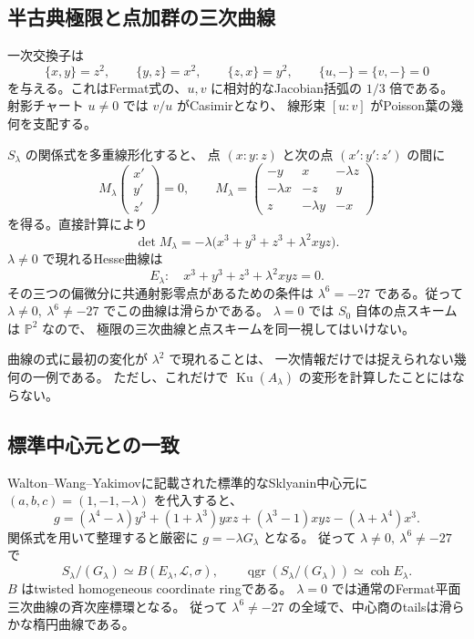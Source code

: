 \documentclass[a4paper,11pt]{ltjsarticle}
\theoremstyle{definition}
\newcommand{\PP}{\mathbb P}
\newcommand{\Ku}{\operatorname{Ku}}
\newcommand{\qgr}{\operatorname{qgr}}
\begin{document}
\subsection{半古典極限と点加群の三次曲線}

一次交換子は
\[
 \{x,y\}=z^2,\qquad\{y,z\}=x^2,\qquad\{z,x\}=y^2,
 \qquad \{u,-\}=\{v,-\}=0
\]
を与える。これはFermat式の、$u,v$ に相対的なJacobian括弧の $1/3$ 倍である。
射影チャート $u\ne0$ では $v/u$ がCasimirとなり、
線形束 $[u:v]$ がPoisson葉の幾何を支配する。

$S_\lambda$ の関係式を多重線形化すると、
点 $(x:y:z)$ と次の点 $(x':y':z')$ の間に
\[
 M_\lambda
 \begin{pmatrix}x'\\y'\\z'\end{pmatrix}=0,\qquad
 M_\lambda=
 \begin{pmatrix}
 -y&x&-\lambda z\\
 -\lambda x&-z&y\\
 z&-\lambda y&-x
 \end{pmatrix}
\]
を得る。直接計算により
\[
 \det M_\lambda=-\lambda\bigl(x^3+y^3+z^3+\lambda^2xyz\bigr).
\]
$\lambda\ne0$ で現れるHesse曲線は
\begin{equation}\label{eq:elliptic}
 E_\lambda:\quad x^3+y^3+z^3+\lambda^2xyz=0.
\end{equation}
その三つの偏微分に共通射影零点があるための条件は
$\lambda^6=-27$ である。従って
$\lambda\ne0,\ \lambda^6\ne-27$ でこの曲線は滑らかである。
$\lambda=0$ では $S_0$ 自体の点スキームは $\PP^2$ なので、
極限の三次曲線と点スキームを同一視してはいけない。

曲線の式に最初の変化が $\lambda^2$ で現れることは、
一次情報だけでは捉えられない幾何の一例である。
ただし、これだけで $\Ku(A_\lambda)$ の変形を計算したことにはならない。

\subsection{標準中心元との一致}

Walton--Wang--Yakimov\cite[Lemma 2.19]{WWY}に記載された標準的なSklyanin中心元に
$(a,b,c)=(1,-1,-\lambda)$ を代入すると、
\[
 g=(\lambda^4-\lambda)y^3+(1+\lambda^3)yxz
       +(\lambda^3-1)xyz-(\lambda+\lambda^4)x^3.
\]
関係式を用いて整理すると厳密に $g=-\lambda G_\lambda$ となる。
従って $\lambda\ne0,\ \lambda^6\ne-27$ で
\[
 S_\lambda/(G_\lambda)\simeq B(E_\lambda,\mathcal L,\sigma),
 \qquad
 \qgr(S_\lambda/(G_\lambda))\simeq\operatorname{coh}E_\lambda.
\]
$B$ はtwisted homogeneous coordinate ringである。
$\lambda=0$ では通常のFermat平面三次曲線の斉次座標環となる。
従って $\lambda^6\ne-27$ の全域で、中心商のtailsは滑らかな楕円曲線である。
\end{document}

